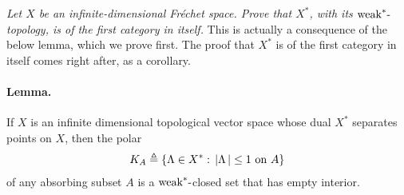 \textit{\noindent
Let $X$ be an infinite-dimensional Fréchet space. %
Prove that $X^\ast$, with its $\text{weak}^\ast\text{-}$topology, %
is of the first category in itself.
}
\newline\newline\noindent
This is actually a consequence of the below lemma,  %
which we prove first. %
The proof that $X^\ast$ is of the first category in itself comes right after, %
as a corollary.%
%
\paragraph{Lemma.}%
If $X$ is an infinite dimensional topological vector space whose dual %
%
  $X^\ast$ %
%
separates points on $X$, then the polar
%
  \begin{align}
    K_A\triangleq \{ \Lambda \in X^\ast:\, \left\lvert \Lambda \,\right\rvert \leq 1 \text{ on } A\}
  \end{align} 
%
of any absorbing subset $A$ is a $\text{weak}^\ast\text{-}$closed set that has empty interior.
%
